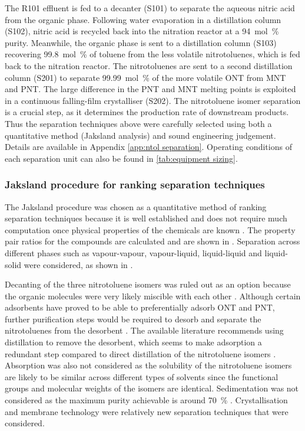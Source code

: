 The R101 effluent is fed to a decanter (S101) to separate the aqueous nitric acid from the organic phase. Following water evaporation in a distillation column (S102), nitric acid is recycled back into the nitration reactor at a \SI{94}{mol\percent} purity.
Meanwhile, the organic phase is sent to a distillation column (S103) recovering \SI{99.8}{mol\percent} of toluene from the less volatile nitrotoluenes, which is fed back to the nitration reactor. The nitrotoluenes are sent to a second distillation column (S201) to separate \SI{99.99}{mol\percent} of the more volatile ONT from MNT and PNT. The large difference in the PNT and MNT melting points is exploited in a continuous falling-film crystalliser (S202). 
The nitrotoluene isomer separation is a crucial step, as it determines the production rate of downstream products. Thus the separation techniques above were carefully selected using both a quantitative method (Jaksland analysis) \cite{jaksland_separation_1995} and sound engineering judgement. Details are available in Appendix \ref{app:ntol separation}. Operating conditions of each separation unit can also be found in \cref{tab:equipment sizing}. 

\label{app:ntol separation}
\subsubsection{Jaksland procedure for ranking separation techniques}
The Jaksland procedure was chosen as a quantitative method of ranking separation techniques because it is well established and does not require much computation once physical properties of the chemicals are known \cite{jaksland_separation_1995}. The property pair ratios for the compounds are calculated and are shown in . Separation across different phases such as vapour-vapour, vapour-liquid, liquid-liquid and liquid-solid were considered, as shown in .

Decanting of the three nitrotoluene isomers was ruled out as an option because the organic molecules were very likely miscible with each other \cite{merck_solvent_2021}. Although certain adsorbents have proved to be able to preferentially adsorb ONT and PNT, further purification steps would be required to desorb and separate the nitrotoluenes from the desorbent \cite{zhao_new_2016}. The available literature recommends using distillation to remove the desorbent, which seems to make adsorption a redundant step compared to direct distillation of the nitrotoluene isomers \cite{zinnen_ep0181106a2_1984}. Absorption was also not considered as the solubility of the nitrotoluene isomers are likely to be similar across different types of solvents since the functional groups and molecular weights of the isomers are identical. Sedimentation was not considered as the maximum purity achievable is around \SI{70}{\percent} \cite{seider_product_2009}. Crystallisation and membrane technology were relatively new separation techniques that were considered. 

